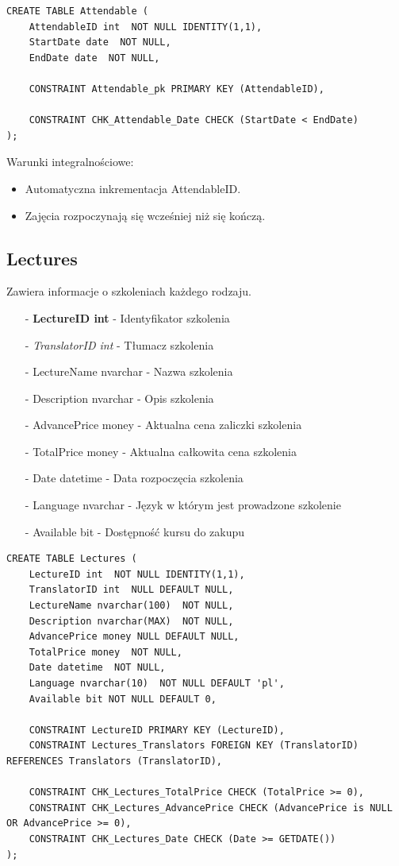 \documentclass[11pt,a4paper]{article}
\begin{document}
\begin{Verbatim}[breaklines=true]
CREATE TABLE Attendable (
    AttendableID int  NOT NULL IDENTITY(1,1),
    StartDate date  NOT NULL,
    EndDate date  NOT NULL,

    CONSTRAINT Attendable_pk PRIMARY KEY (AttendableID),

    CONSTRAINT CHK_Attendable_Date CHECK (StartDate < EndDate)
);
\end{Verbatim}

Warunki integralnościowe:
\begin{itemize}
    \item Automatyczna inkrementacja AttendableID.
    \item Zajęcia rozpoczynają się wcześniej niż się kończą.
\end{itemize}

\subsection{Lectures}
Zawiera informacje o szkoleniach każdego rodzaju.

\begin{itemize}
    \item[-] \textbf{LectureID int} - Identyfikator szkolenia
    \item[-] \textit{TranslatorID int} - Tłumacz szkolenia
    \item[-] LectureName nvarchar - Nazwa szkolenia
    \item[-] Description nvarchar - Opis szkolenia
    \item[-] AdvancePrice money - Aktualna cena zaliczki szkolenia
    \item[-] TotalPrice money - Aktualna całkowita cena szkolenia
    \item[-] Date datetime - Data rozpoczęcia szkolenia
    \item[-] Language nvarchar - Język w którym jest prowadzone szkolenie
    \item[-] Available bit - Dostępność kursu do zakupu
\end{itemize}

\begin{Verbatim}[breaklines=true]
CREATE TABLE Lectures (
    LectureID int  NOT NULL IDENTITY(1,1),
    TranslatorID int  NULL DEFAULT NULL,
    LectureName nvarchar(100)  NOT NULL,
    Description nvarchar(MAX)  NOT NULL,
    AdvancePrice money NULL DEFAULT NULL,
    TotalPrice money  NOT NULL,
    Date datetime  NOT NULL,
    Language nvarchar(10)  NOT NULL DEFAULT 'pl',
    Available bit NOT NULL DEFAULT 0,

    CONSTRAINT LectureID PRIMARY KEY (LectureID),
    CONSTRAINT Lectures_Translators FOREIGN KEY (TranslatorID) REFERENCES Translators (TranslatorID),

    CONSTRAINT CHK_Lectures_TotalPrice CHECK (TotalPrice >= 0),
    CONSTRAINT CHK_Lectures_AdvancePrice CHECK (AdvancePrice is NULL OR AdvancePrice >= 0),
    CONSTRAINT CHK_Lectures_Date CHECK (Date >= GETDATE())
);
\end{Verbatim}
\end{document}
